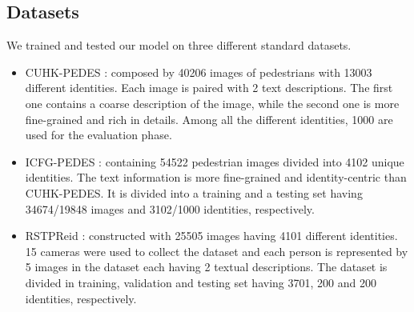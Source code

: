 \documentclass[acmsmall]{acmart}
\begin{document}
\subsection{Datasets}
We trained and tested our model on three different standard datasets.
\begin{itemize}
    \item CUHK-PEDES \cite{li2017person}: composed by 40206 images of pedestrians with 13003 different identities. Each image is paired with 2 text descriptions. The first one contains a coarse description of the image, while the second one is more fine-grained and rich in details. Among all the different identities, 1000 are used for the evaluation phase.
    \item ICFG-PEDES \cite{ding2021semantically}: containing 54522 pedestrian images divided into 4102 unique identities. The text information is more fine-grained and identity-centric than CUHK-PEDES. It is divided into a training and a testing set having 34674/19848 images and 3102/1000 identities, respectively.
    \item RSTPReid \cite{zhu2021dssl}: constructed with 25505 images having 4101 different identities. 15 cameras were used to collect the dataset and each person is represented by 5 images in the dataset each having 2 textual descriptions. The dataset is divided in training, validation and testing set having 3701, 200 and 200 identities, respectively.
    
\end{itemize}
\end{document}
